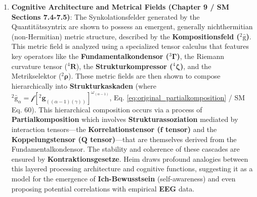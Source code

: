 \documentclass[12pt]{article}
\newcommand{\kompositionsfeld}{{}^2\bar{\mathrm{g}}}
\newcommand{\partialstruktur}[1]{{}^2\mathbf{g}_{(#1)}}
\newcommand{\fundamentalkondensor}{{}^3\bm{\Gamma}}
\newcommand{\korrelationstensor}{\mathbf{f}}
\newcommand{\koppelungstensor}{\mathbf{Q}}
\newcommand{\strukturkompressor}{{}^4\bm{\zeta}}
\begin{document}
\begin{enumerate}
    \item \textbf{Cognitive Architecture and Metrical Fields (Chapter 9 / SM Sections 7.4-7.5)}: The Synkolationsfelder generated by the Quantitätssyntrix are shown to possess an emergent, generally nichthermitian (non-Hermitian) metric structure, described by the \textbf{Kompositionsfeld (\( \kompositionsfeld \))}. This metric field is analyzed using a specialized tensor calculus that features key operators like the \textbf{Fundamentalkondensor (\( \fundamentalkondensor \))}, the Riemann curvature tensor (\( {}^4\mathbf{R} \)), the \textbf{Strukturkompressor (\( \strukturkompressor \))}, and the Metrikselektor (\( {}^2\bm{\rho} \)). These metric fields are then shown to compose hierarchically into \textbf{Strukturkaskaden} (where \( \kompositionsfeld_\alpha = \mathcal{f}[\partialstruktur{(\alpha-1)(\gamma)}]^{\omega_{(\alpha-1)}} \), Eq. \eqref{eq:original_partialkomposition} / SM Eq. 60). This hierarchical composition occurs via a process of \textbf{Partialkomposition} which involves \textbf{Strukturassoziation} mediated by interaction tensors—the \textbf{Korrelationstensor (\( \korrelationstensor \) tensor)} and the \textbf{Koppelungstensor (\( \koppelungstensor \) tensor)}—that are themselves derived from the Fundamentalkondensor. The stability and coherence of these cascades are ensured by \textbf{Kontraktionsgesetze}. Heim draws profound analogies between this layered processing architecture and cognitive functions, suggesting it as a model for the emergence of \textbf{Ich-Bewusstsein} (self-awareness) and even proposing potential correlations with empirical \textbf{EEG} data.


\end{enumerate}
\end{document}

